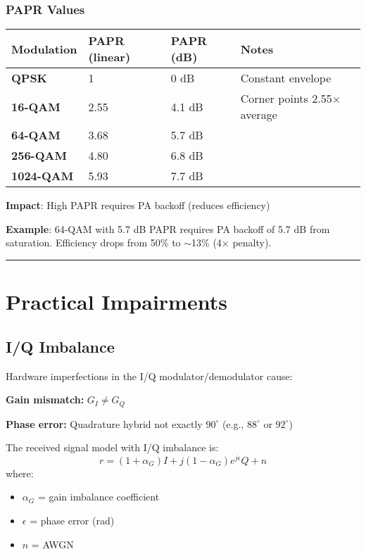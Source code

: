 \subsubsection{PAPR Values}\label{papr-values}

{\def\LTcaptype{} %
\begin{longtable}[]{@{}llll@{}}
\toprule\noalign{}
Modulation & PAPR (linear) & PAPR (dB) & Notes \\
\midrule\noalign{}
\endhead
\bottomrule\noalign{}
\endlastfoot
\textbf{QPSK} & 1 & 0 dB & Constant envelope \\
\textbf{16-QAM} & 2.55 & 4.1 dB & Corner points 2.55$\times$ average \\
\textbf{64-QAM} & 3.68 & 5.7 dB & \\
\textbf{256-QAM} & 4.80 & 6.8 dB & \\
\textbf{1024-QAM} & 5.93 & 7.7 dB & \\
\end{longtable}
}

\textbf{Impact}: High PAPR requires PA backoff (reduces efficiency)

\textbf{Example}: 64-QAM with 5.7 dB PAPR requires PA backoff of 5.7 dB from saturation. Efficiency drops from 50\% to $\sim$13\% (4$\times$ penalty).

\begin{center}\rule{0.5\linewidth}{0.5pt}\end{center}

\section{Practical Impairments}

\subsection{I/Q Imbalance}

Hardware imperfections in the I/Q modulator/demodulator cause:

\textbf{Gain mismatch:} $G_I \neq G_Q$

\textbf{Phase error:} Quadrature hybrid not exactly $90^\circ$ (e.g., $88^\circ$ or $92^\circ$)

The received signal model with I/Q imbalance is:
\begin{equation}
r = (1 + \alpha_G) I + j(1 - \alpha_G) e^{j\epsilon} Q + n
\label{eq:iq-imbalance}
\end{equation}
where:
\begin{itemize}
\item $\alpha_G$ = gain imbalance coefficient
\item $\epsilon$ = phase error (rad)
\item $n$ = AWGN
\end{itemize}

